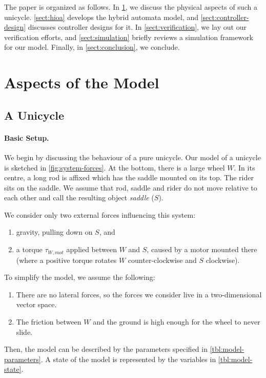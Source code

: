 \documentclass[copyright,submission]{eptcs}
\newcommand{\mi}[1]{\mathit{#1}}
\begin{document}
The paper is organized as follows.
In \cref{sect:model-aspects}, we discuss the physical aspects of such a unicycle. \cref{sect:hioa} develops the hybrid automata model, and  \cref{sect:controller-design} discusses  controller designs for it.
In \cref{sect:verification}, we lay out our verification efforts, and \cref{sect:simulation} briefly reviews a simulation framework for our model. Finally, in \cref{sect:conclusion}, we conclude.


\section{Aspects of the Model}\label{sect:model-aspects}

\subsection{A Unicycle}\label{sect:physics-summary}

\paragraph{Basic Setup.}
We begin by discussing the behaviour of a pure unicycle.
Our model of a unicycle is sketched in \cref{fig:system-forces}. At the
bottom, there is a large wheel $W$. In its centre, a long rod is
affixed which has the saddle mounted on its top. The rider sits on the
saddle. We assume that rod, saddle and rider do not move relative to
each other and call the resulting object \emph{saddle} ($S$).

We consider only two external forces influencing this system:
\begin{enumerate}
\item gravity, pulling down on $S$, and
\item a torque $\tau_{W, \mi{mot}}$ applied between $W$ and $S$, caused by a motor mounted there (where a positive torque rotates $W$ counter-clockwise and $S$ clockwise).
\end{enumerate}

To simplify the model, we assume the following:
\begin{enumerate}
\item There are no lateral forces, so the forces we consider live in a two-dimensional vector space.
\item The friction between $W$ and the ground is high enough for the wheel to never slide.
\end{enumerate}

Then, the model can be described by the parameters specified
in \cref{tbl:model-parameters}. A state of the model is represented by
the variables in \cref{tbl:model-state}.
\end{document}
